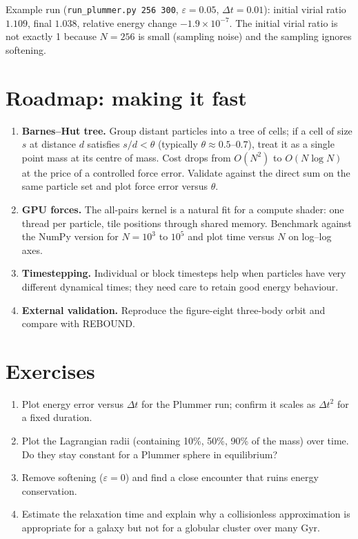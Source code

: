 Example run (\texttt{run\_plummer.py 256 300}, $\varepsilon=0.05$, $\Delta t=0.01$): initial virial ratio $1.109$, final $1.038$, relative energy change $-1.9\times10^{-7}$. The initial virial ratio is not exactly 1 because $N=256$ is small (sampling noise) and the sampling ignores softening.

\section{Roadmap: making it fast}
\begin{enumerate}
\item \textbf{Barnes--Hut tree.} Group distant particles into a tree of cells; if a cell of size $s$ at distance $d$ satisfies $s/d<\theta$ (typically $\theta\approx0.5$--$0.7$), treat it as a single point mass at its centre of mass. Cost drops from $O(N^2)$ to $O(N\log N)$ at the price of a controlled force error. Validate against the direct sum on the same particle set and plot force error versus $\theta$.
\item \textbf{GPU forces.} The all-pairs kernel is a natural fit for a compute shader: one thread per particle, tile positions through shared memory. Benchmark against the NumPy version for $N=10^3$ to $10^5$ and plot time versus $N$ on log--log axes.
\item \textbf{Timestepping.} Individual or block timesteps help when particles have very different dynamical times; they need care to retain good energy behaviour.
\item \textbf{External validation.} Reproduce the figure-eight three-body orbit and compare with REBOUND.
\end{enumerate}

\section{Exercises}
\begin{enumerate}
\item Plot energy error versus $\Delta t$ for the Plummer run; confirm it scales as $\Delta t^2$ for a fixed duration.
\item Plot the Lagrangian radii (containing 10\%, 50\%, 90\% of the mass) over time. Do they stay constant for a Plummer sphere in equilibrium?
\item Remove softening ($\varepsilon=0$) and find a close encounter that ruins energy conservation.
\item Estimate the relaxation time and explain why a collisionless approximation is appropriate for a galaxy but not for a globular cluster over many Gyr.
\end{enumerate}

